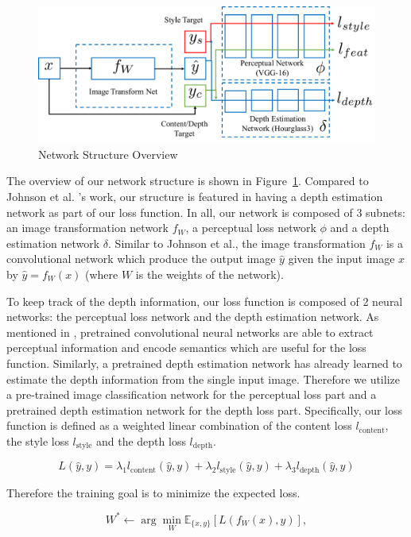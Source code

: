 \documentclass[10pt,twocolumn,letterpaper]{article}
\begin{document}
\begin{figure}[h]
\centering
\includegraphics[scale=0.4]{network_structure.pdf}
\caption{Network Structure Overview}
\label{fig:overview}
\end{figure}
The overview of our network structure is shown in Figure~\ref{fig:overview}. Compared to Johnson et al. \cite{johnson2016perceptual}'s work, our structure is featured in having a depth estimation network as part of our loss function. In all, our network is composed of 3 subnets: an image transformation network $f_W$, a perceptual loss network $\phi$ and a depth estimation network $\delta$. Similar to Johnson et al., the image transformation $f_W$ is a convolutional network which produce the output image $\hat y$ given the input image $x$ by $\hat y = f_W(x)$ (where $W$ is the weights of the network).

To keep track of the depth information, our loss function is composed of 2 neural networks: the perceptual loss network and the depth estimation network. As mentioned in \cite{johnson2016perceptual}, pretrained convolutional neural networks are able to extract perceptual information and encode semantics which are useful for the loss function. Similarly, a pretrained depth estimation network has already learned to estimate the depth information from the single input image. Therefore we utilize a pre-trained image classification network for the perceptual loss part and a pretrained depth estimation network for the depth loss part. Specifically, our loss function is defined as a weighted linear combination of the content loss $l_\text{content}$, the style loss $l_\text{style}$ and the depth loss $l_\text{depth}$. 

\[L(\hat y, y) = \lambda_1 l_\text{content}(\hat y, y) + \lambda_2 l_\text{style}(\hat y, y) + \lambda_3 l_\text{depth}(\hat y, y)\]

Therefore the training goal is to minimize the expected loss.

\[ W^* \gets \arg \min_W \mathbb E_{\{x,y\}}[L(f_W(x), y)], \]
\end{document}

